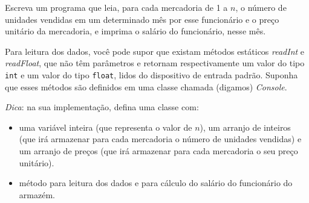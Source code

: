 \documentclass[brazil]{article}
\begin{document}
\begin{enumerate}
Escreva um programa que leia, para cada mercadoria de 1 a $n$, o
n\'umero de unidades vendidas em um determinado m\^es por esse
funcion\'ario e o pre\c{c}o unit\'ario da mercadoria, e imprima o
sal\'ario do funcion\'ario, nesse m\^es.

Para leitura dos dados, voc\^e pode supor que existam m\'etodos
est\'aticos {\it readInt\/} e {\it readFloat\/}, que n\~ao t\^em
par\^ametros e retornam respectivamente um valor do tipo {\tt int} e
um valor do tipo {\tt float}, lidos do dispositivo de entrada
padr\~ao. Suponha que esses m\'etodos s\~ao definidos em uma classe
chamada (digamos) {\it Console\/}.

{\em Dica\/}: na sua implementa\c{c}\~ao, defina uma classe com:

\begin{itemize}

  \item uma vari\'avel inteira (que representa o valor de $n$), um
  arranjo de inteiros (que ir\'a armazenar para cada mercadoria o
  n\'umero de unidades vendidas) e um arranjo de pre\c{c}os (que ir\'a
  armazenar para cada mercadoria o seu pre\c{c}o unit\'ario).

  \item m\'etodo para leitura dos dados e para c\'alculo do sal\'ario
  do funcion\'ario do armaz\'em.

\end{itemize}

\end{enumerate} 
\end{document}
